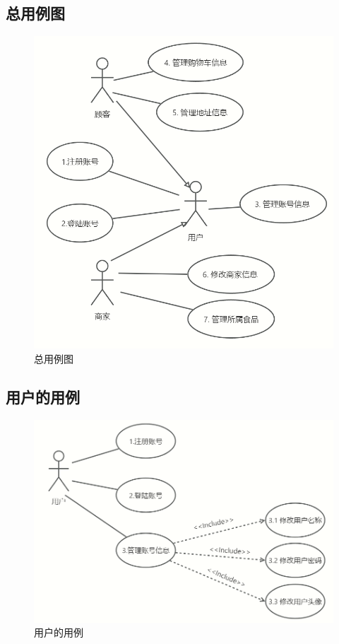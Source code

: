 \subsection{总用例图}
\begin{figure}[H]
    \centering
    \includegraphics[width=0.75\linewidth]{pics/9.png}
    \caption{总用例图}
    \label{fig:zylt}
\end{figure}

\subsection{用户的用例}
\begin{figure}[H]
    \centering
    \includegraphics[width=0.75\linewidth]{pics/10.png}
    \caption{用户的用例}
    \label{fig:yhdyl}
\end{figure}


